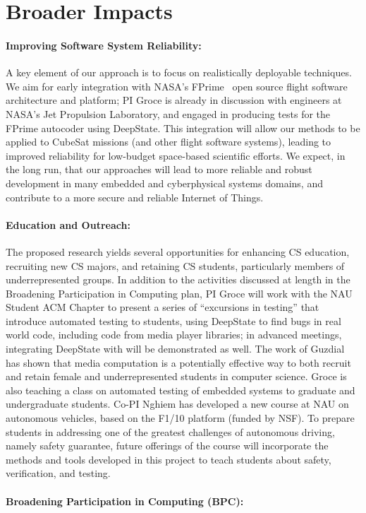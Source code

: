 \section{Broader Impacts}

\paragraph{Improving Software System Reliability:} A key element of
our approach is to focus on realistically deployable techniques.  We aim
for early integration with NASA's FPrime~\cite{fprime,fprimerepo}
open source
flight software architecture and platform; PI Groce is already in
discussion with engineers at NASA's Jet Propulsion Laboratory, and
engaged in producing tests for the FPrime autocoder using DeepState.
This integration will allow our
methods to be applied to CubeSat missions (and other flight software
systems), leading to improved reliability for low-budget space-based
scientific efforts.  We expect, in the long run, that our approaches
will lead to more reliable and robust development in many embedded and
cyberphysical systems domains, and contribute to a more secure and
reliable Internet of Things.

\paragraph{Education and Outreach:}
The proposed research yields several opportunities for enhancing CS
education, recruiting new CS majors, and retaining CS students,
particularly members of underrepresented groups.  In addition to the
activities discussed at length in the Broadening Participation in
Computing plan, PI Groce will work with the NAU Student ACM Chapter to
present a series of ``excursions in testing'' that introduce automated
testing to students, using DeepState to find bugs in real world code,
including code from media player libraries; in advanced meetings,
integrating DeepState with \framac will be demonstrated as well.  The
work of Guzdial \cite{Guzdial} has shown that media computation is a
potentially effective way to both recruit and retain female and
underrepresented students in computer science. Groce is also teaching
a class on automated testing of embedded systems to graduate and
undergraduate students.  Co-PI Nghiem has developed a new course at
NAU on autonomous vehicles, based on the F1/10 platform (funded by
NSF). %
To prepare students in addressing one of the greatest challenges of
autonomous driving, namely safety guarantee, future offerings of the course will incorporate the methods and tools developed in this project to teach students
about safety, verification, and testing.


\paragraph{Broadening Participation in Computing (BPC):}


